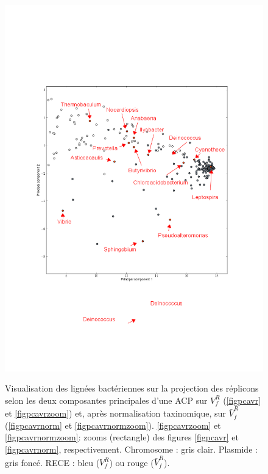\begin{figure}[H]
\begin{minipage}{0.55\textwidth}
		\includegraphics[trim=2cm 7cm 2cm 6cm,clip,width=\textwidth]{./img/pca_norm_func_ZOOM.png}
		\label{figpcavrnormzoom}
	\end{minipage}
	\begin{center}
	\caption[Visualisation des lignées bactériennes sur la projection des réplicons selon les deux composantes principales d'une ACP]{Visualisation des lignées bactériennes sur la projection des réplicons selon les deux composantes principales d'une ACP sur $V^{R}_{f}$ (\ref{figpcavr} et \ref{figpcavrzoom}) et, après normalisation taxinomique, sur $\bar{V}^{R}_{f}$ (\ref{figpcavrnorm} et \ref{figpcavrnormzoom}). \ref{figpcavrzoom} et \ref{figpcavrnormzoom}: zooms (rectangle) des figures \ref{figpcavr} et \ref{figpcavrnorm}, respectivement. Chromosome : gris clair. Plasmide : gris foncé. RECE : bleu ($V^{R}_{f}$) ou rouge ($\bar{V}^{R}_{f}$).} 
	\label{figpcaproj}
	\end{center}
\end{figure}	

